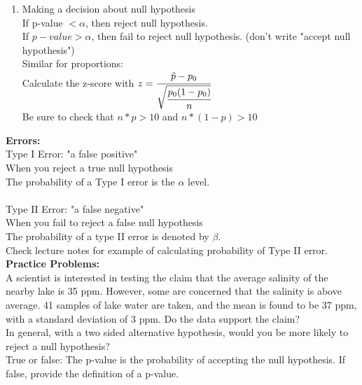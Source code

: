 \documentclass[12pt]{article}
\begin{document}
\begin{enumerate}
\item Making a decision about null hypothesis\\
If p-value $< \alpha$, then reject null hypothesis.\\
If $p-value > \alpha$, then fail to reject null hypothesis. (don't write "accept null hypothesis") \\

Similar for proportions:\\
Calculate the z-score with $z=\cfrac{\hat{p}-p_{0}}{\sqrt{\cfrac{p_{0}(1-p_{0})}{n}}}$ \\
Be sure to check that $n*p>10$ and $n*(1-p)>10$ \\

\end{enumerate}

\noindent \textbf{Errors:} \\
\noindent Type I Error: "a false positive"\\
\noindent When you reject a true null hypothesis \\
\noindent The probability of a Type I error is the $\alpha$ level.\\
\\
\noindent Type II Error: "a false negative"\\
\noindent When you fail to reject a false null hypothesis \\
\noindent The probability of a type II error is denoted by $\beta$.\\
Check lecture notes for example of calculating probability of Type II error.\\

\noindent \textbf{Practice Problems:} \\
\noindent A scientist is interested in testing the claim that the average salinity of the nearby lake is 35 ppm. However, some are concerned that the salinity is above average. 41 samples of lake water are taken, and the mean is found to be 37 ppm, with a standard deviation of 3 ppm. Do the data support the claim? \\

\noindent In general, with a two sided alternative hypothesis, would you be more likely to reject a null hypothesis? \\

\noindent True or false: The p-value is the probability of accepting the null hypothesis. If false, provide the definition of a p-value. \\
\end{document}
